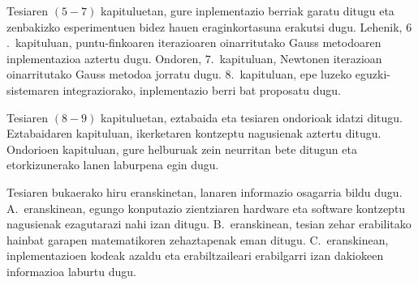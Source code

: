 Tesiaren $(5-7)$ kapituluetan, gure inplementazio berriak garatu ditugu eta zenbakizko esperimentuen bidez hauen eraginkortasuna erakutsi dugu. Lehenik, $6$.~kapituluan, puntu-finkoaren iterazioaren oinarritutako Gauss metodoaren inplementazioa aztertu dugu. Ondoren, $7$.~kapituluan, Newtonen iterazioan oinarritutako Gauss metodoa jorratu dugu. $8$.~kapituluan, epe luzeko eguzki-sistemaren integraziorako, inplementazio berri bat proposatu dugu.  

Tesiaren $(8-9)$ kapituluetan, eztabaida eta tesiaren ondorioak idatzi ditugu. Eztabaidaren kapituluan, ikerketaren kontzeptu nagusienak aztertu ditugu. Ondorioen kapituluan, gure helburuak zein neurritan bete ditugun eta etorkizunerako lanen laburpena egin dugu. 

Tesiaren bukaerako hiru eranskinetan, lanaren informazio osagarria bildu dugu. A.~eranskinean, egungo konputazio zientziaren hardware eta software kontzeptu nagusienak ezagutarazi nahi izan ditugu. B.~eranskinean, tesian zehar erabilitako hainbat garapen matematikoren zehaztapenak eman ditugu. C.~eranskinean, inplementazioen kodeak azaldu eta erabiltzaileari erabilgarri izan dakiokeen informazioa laburtu dugu. %

      
      

